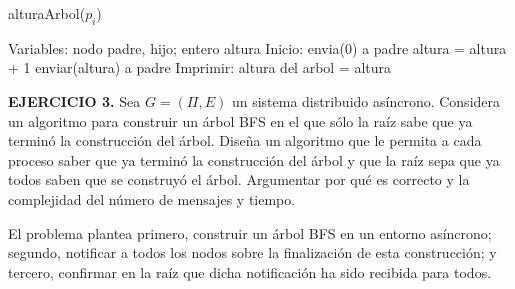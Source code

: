 \documentclass[12pt]{article}
\begin{document}
\begin{algorithm}
\caption{alturaArbol($p_i$)}
\begin{algorithmic}[1]
\State Variables: nodo padre, hijo; entero altura
\State Inicio:
    \State envia(0) a padre
\Else
    \State altura = altura + 1
        \State enviar(altura) a padre
    \EndIf
\EndIf
\State Imprimir: altura del arbol = altura
\end{algorithmic}
\end{algorithm}


\begin{ejercicio}
\noindent \textbf{EJERCICIO 3.} 
Sea $G = (\Pi, E)$ un sistema distribuido asíncrono. Considera un algoritmo para construir un árbol BFS en el que sólo la raíz sabe que ya terminó la construcción del árbol. Diseña un algoritmo que le permita a cada proceso saber que ya terminó la construcción del árbol y que la raíz sepa que ya todos saben que se construyó el árbol. Argumentar por qué es correcto y la complejidad del número de mensajes y tiempo. \\
\end{ejercicio}

El problema plantea primero, construir un \'arbol BFS en un entorno as\'incrono; segundo, notificar a todos los nodos sobre la finalizaci\'on de esta construcci\'on; y tercero, confirmar en la ra\'iz que dicha notificaci\'on ha sido recibida para todos.
\end{document}
